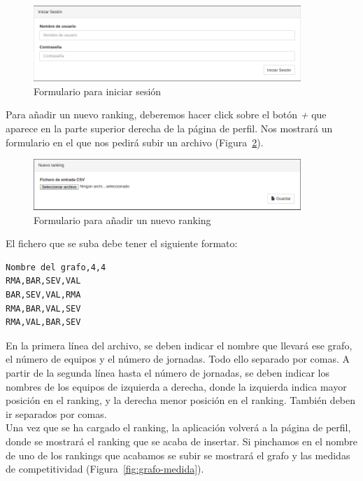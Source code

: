 \begin{figure}[htb]
\centering
\includegraphics[width=0.9\textwidth]{imagenes/pantallazos-aplicacion/inicio-sesion}
\caption{Formulario para iniciar sesión}
\label{fig:inicio-sesion}
\end{figure}

Para añadir un nuevo ranking, deberemos hacer click sobre el botón \emph{+} que aparece en la parte superior derecha de la página de perfil. Nos mostrará un formulario en el que nos pedirá subir un archivo (Figura~\ref{fig:nuevo-ranking}). \\

\begin{figure}[htb]
\centering
\includegraphics[width=0.9\textwidth]{imagenes/pantallazos-aplicacion/nuevo-ranking}
\caption{Formulario para añadir un nuevo ranking}
\label{fig:nuevo-ranking}
\end{figure}

El fichero que se suba debe tener el siguiente formato:

\begin{verbatim}
Nombre del grafo,4,4
RMA,BAR,SEV,VAL
BAR,SEV,VAL,RMA
RMA,BAR,VAL,SEV
RMA,VAL,BAR,SEV
\end{verbatim}

En la primera línea del archivo, se deben indicar el nombre que llevará ese grafo, el número de equipos y el número de jornadas. Todo ello separado por comas. A partir de la segunda línea hasta el número de jornadas, se deben indicar los nombres de los equipos de izquierda a derecha, donde la izquierda indica mayor posición en el ranking, y la derecha menor posición en el ranking. También deben ir separados por comas.\\

Una vez que se ha cargado el ranking, la aplicación volverá a la página de perfil, donde se mostrará el ranking que se acaba de insertar. Si pinchamos en el nombre de uno de los rankings que acabamos se subir se mostrará el grafo y las medidas de competitividad (Figura~\ref{fig:grafo-medida}). 

